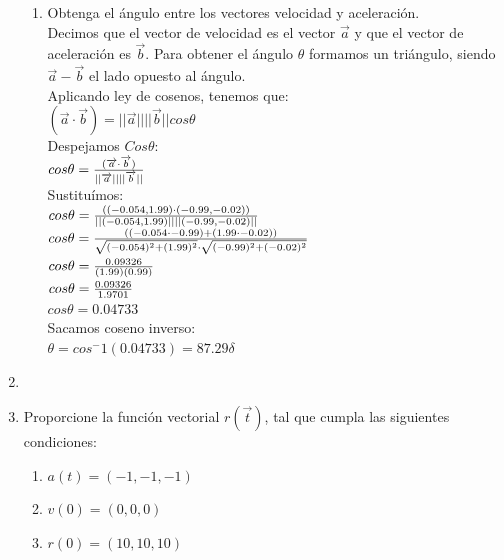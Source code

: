 \documentclass[10pt,letterpaper,fleqn]{article}
\begin{document}
\begin{enumerate}
\begin{enumerate}
            \item Obtenga el ángulo entre los vectores velocidad y aceleración.
            \\ Decimos que el vector de velocidad es el vector $\overrightarrow{a}$ y que el vector de aceleración es $\overrightarrow{b}$. Para obtener el ángulo $\theta$ formamos un triángulo, siendo $\overrightarrow{a}-\overrightarrow{b}$ el lado opuesto al ángulo.
            \\ Aplicando ley de cosenos, tenemos que: \\
            $(\overrightarrow{a} \cdot \overrightarrow{b})=||\overrightarrow{a}|| ||\overrightarrow{b}|| cos \theta $ \\
            Despejamos $Cos \theta$: \\
            $cos \theta = {(\overrightarrow{a} \cdot \overrightarrow{b}) \over ||\overrightarrow{a}|| ||\overrightarrow{b}||}$ \\ 
            Sustituímos: \\
            $cos \theta = {((-0.054,1.99) \cdot (-0.99,-0.02)) \over ||(-0.054,1.99)|| ||(-0.99,-0.02)||}$ \\
            $cos \theta = {((-0.054 \cdot-0.99) + (1.99 \cdot -0.02)) \over \sqrt{(-0.054)^2 + (1.99)^2} \cdot \sqrt{(-0.99)^2 + (-0.02)^2}}$ \\
            $cos \theta = {0.09326 \over (1.99)(0.99)}$ \\
            $cos \theta = {0.09326 \over 1.9701}$ \\
            $cos \theta = {0.04733}$ \\
            Sacamos coseno inverso: \\
            $\theta = cos^-1 (0.04733) = 87.29 \delta$

        \end{enumerate}


        \item

        \item Proporcione la función vectorial $r(\overrightarrow{t})$, tal que cumpla las siguientes condiciones:
        \begin{enumerate}
            \item $a(t)=(-1,-1,-1)$
            \item $v(0)=(0,0,0)$
            \item $r(0)=(10,10,10)$
        \end{enumerate}


\end{enumerate}
\end{document}

